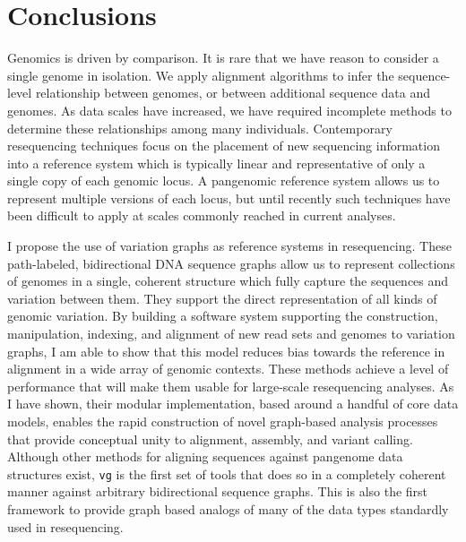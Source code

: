 %
\chapter{Conclusions}

\ifpdf
    \graphicspath{{Chapter3/Figs/Raster/}{Chapter3/Figs/PDF/}{Chapter3/Figs/}}
\else
    \graphicspath{{Chapter3/Figs/Vector/}{Chapter3/Figs/}}
\fi

Genomics is driven by comparison.
It is rare that we have reason to consider a single genome in isolation.
We apply alignment algorithms to infer the sequence-level relationship between genomes, or between additional sequence data and genomes.
As data scales have increased, we have required incomplete methods to determine these relationships among many individuals.
Contemporary resequencing techniques focus on the placement of new sequencing information into a reference system which is typically linear and representative of only a single copy of each genomic locus.
A pangenomic reference system allows us to represent multiple versions of each locus, but until recently such techniques have been difficult to apply at scales commonly reached in current analyses.

I propose the use of variation graphs as reference systems in resequencing.
These path-labeled, bidirectional DNA sequence graphs allow us to represent collections of genomes in a single, coherent structure which fully capture the sequences and variation between them.
They support the direct representation of all kinds of genomic variation.
By building a software system supporting the construction, manipulation, indexing, and alignment of new read sets and genomes to variation graphs, I am able to show that this model reduces bias towards the reference in alignment in a wide array of genomic contexts.
These methods achieve a level of performance that will make them usable for large-scale resequencing analyses.
As I have shown, their modular implementation, based around a handful of core data models, enables the rapid construction of novel graph-based analysis processes that provide conceptual unity to alignment, assembly, and variant calling.
Although other methods for aligning sequences against pangenome data structures exist, {\tt vg} is the first set of tools that does so in a completely coherent manner against arbitrary bidirectional sequence graphs.
This is also the first framework to provide graph based analogs of many of the data types standardly used in resequencing.

